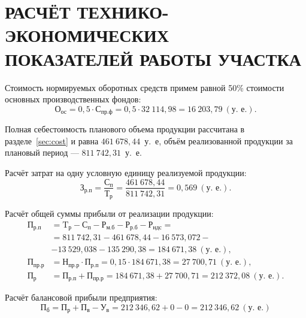\section[%
Расчёт технико-экономических показателей работы участка
]{%
РАСЧЁТ ТЕХНИКО-ЭКОНОМИЧЕСКИХ \\
ПОКАЗАТЕЛЕЙ РАБОТЫ УЧАСТКА
}
\label{sec:tep}

Стоимость нормируемых оборотных средств примем равной 50\% стоимости
основных производственных фондов:
\begin{equation*}
  \text{О}_{\text{ос}} = 0{,}5 \cdot \text{С}_{\text{пр.ф}} =
  0{,}5 \cdot 32~114{,}98 = 16~203{,}79~(\text{у.~е.}).
\end{equation*}

Полная себестоимость планового объема продукции рассчитана в
разделе~\ref{sec:cost} и равна $461~678{,}44$~у.~е, объём реализованной
продукции за плановый период --- $811~742{,}31$~у.~е.

Расчёт затрат на одну условную единицу реализуемой продукции:
\begin{equation*}
  \text{З}_{\text{р.п}} = \dfrac{\text{С}_{\text{п}}}{\text{Т}_{\text{р}}} =
  \dfrac{461~678{,}44}{811~742{,}31} = 0{,}569 ~ (\text{у.~е.}).
\end{equation*}

Расчёт общей суммы прибыли от реализации продукции:
\begin{align*}
  \text{П}_{\text{р.п}} &=
  \text{T}_{\text{р}} - \text{С}_{\text{п}} - \text{Р}_{\text{м.б}} -
  \text{Р}_{\text{р.б}} - \text{Р}_{\text{ндс}} = \\
  &= 811~742{,}31 - 461~678{,}44 - 16~573{,}072 - \\
  &- 13~529{,}038 - 135~290{,}38 = 184~671{,}38 ~ (\text{у.~е.}), \\
  \text{П}_{\text{пр.р}} &= \text{Н}_{\text{пр.р}} \cdot \text{П}_{\text{р.п}} =
  0{,}15 \cdot 184~671{,}38 = 27~700{,}71 ~ (\text{у.~е.}), \\
  \text{П}_{\text{р}} &= \text{П}_{\text{р.п}} + \text{П}_{\text{пр.р}} =
  184~671{,}38 + 27~700{,}71 = 212~372{,}08 ~ (\text{у.~е.}).
\end{align*}

Расчёт балансовой прибыли предприятия:
\begin{equation*}
  \text{П}_{\text{б}} = \text{П}_{\text{р}} + \text{П}_{\text{в}} - \text{У}_{\text{в}} =
  212~346{,}62 + 0 - 0 = 212~346{,}62~(\text{у.~е.})
\end{equation*}

